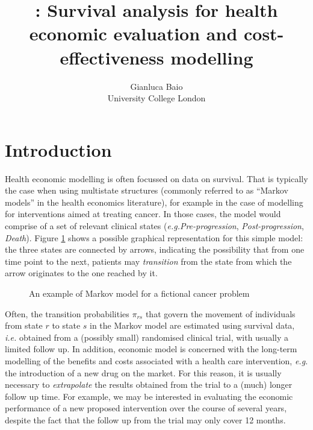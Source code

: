 \documentclass[article,nojss]{jss}
\author{Gianluca Baio\\University College London}
\title{\pkg{survHE}: Survival analysis for health economic evaluation and cost-effectiveness modelling}
\newcommand{\ie}{{\em i.e.\/}\xspace}
\newcommand{\eg}{{\em e.g.\/}\xspace}
\begin{document}
\section{Introduction}
Health economic modelling is often focussed on data on survival. That is typically the case when using multistate structures (commonly referred to as ``Markov models'' in the health economics literature), for example in the case of modelling for interventions aimed at treating cancer. In those cases, the model would comprise of a set of relevant clinical states (\eg \textit{Pre-progression}, \textit{Post-progression}, \textit{Death}). Figure \ref{MM} shows a possible graphical representation for this simple model: the three states are connected by arrows, indicating the possibility that from one time point to the next, patients may \textit{transition} from the state from which the arrow originates to the one reached by it.

\begin{figure}[!h]
\centering
{}
\caption{An example of Markov model for a fictional cancer problem}\label{MM}
\end{figure}

Often, the transition probabilities $\pi_{rs}$ that govern the movement of individuals from state $r$ to state $s$ in the Markov model are estimated using survival data, \ie obtained from a (possibly small) randomised clinical trial, with usually a limited follow up.  In addition, economic model is concerned with the long-term modelling of the benefits and costs associated with a health care intervention, \eg the introduction of a new drug on the market. For this reason, it is usually necessary to \textit{extrapolate} the results obtained from the trial to a (much) longer follow up time. For example, we may be interested in evaluating the economic performance of a new proposed intervention over the course of several years, despite the fact that the follow up from the trial may only cover 12 months.
\end{document}
